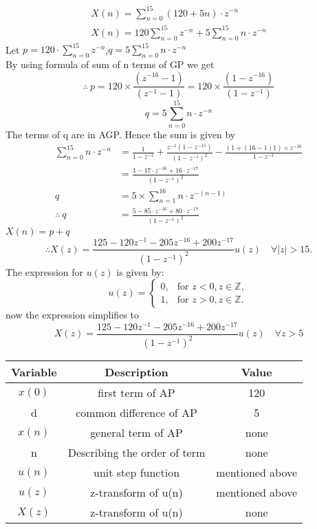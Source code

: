 \documentclass[journal,12pt,twocolumn]{IEEEtran}
\theoremstyle{remark}
\begin{document}
\begin{align}
   X(n) = \sum_{n=0}^{15} (120+5n) \cdot z^{-n}\\
   X(n) = 120\sum_{n=0}^{15}z^{-n}+5\sum_{n=0}^{15}n\cdot z^{-n}
\end{align}
Let $p = 120 \cdot \sum_{n=0}^{15} z^{-n}$,$q = 5\sum_{n=0}^{15}n\cdot z^{-n}$\\
By using formula of sum of n terms of GP we get
\begin{equation}
    \therefore\ p=120\times \frac{ ( z^{-16}-1)}{(z^{-1}-1)}=120\times \frac{ (1 - z^{-16})}{(1 - z^{-1})}
\end{equation}
\begin{equation}
   q= 5\sum_{n=0}^{15}n\cdot z^{-n}  
\end{equation}
The terms of q are in AGP. Hence the sum is given by
\begin{align}
  \sum_{n=0}^{15}n\cdot z^{-n}&= \frac{1}{1 - z^{-1} }+ \frac{z^{-1}(1 - z^{-15})}{(1 - z^{-1})^2}-\frac{(1+(16-1)1)\times z^{-16}}{1-z^{-1}} \\
  &=\frac{1-17\cdot z^{-16}+16\cdot z^{-17}}{(1-z^{-1})^{2}}\\
q&=5\times \sum_{n=1}^{16}n\cdot z^{-(n-1)}\\
\therefore \ q&=\frac{5-85\cdot z^{-16}+80\cdot z^{-17}}{(1-z^{-1})^{2}}
\end{align}
$X(n)=p+q$
\begin{equation}
\therefore X(z) = \frac{125 -120 z^{-1}-205 z^{-16}+200 z^{-17}}{(1-z^{-1})^2} u(z) \quad \forall \lvert z \rvert > 15.
\end{equation}
The expression for \( u(z) \) is given by:
\[
u(z) = 
\begin{cases}
    0, & \text{for } z < 0, z \in \mathbb{Z}, \\
    1, & \text{for } z > 0, z \in \mathbb{Z}.
\end{cases}
\]
now the expression simplifies to 
\begin {equation}
X(z) = \frac{125 -120 z^{-1}-205 z^{-16}+200 z^{-17}}{(1-z^{-1})^2} u(z) \quad \forall z>5
\end {equation}
\begin{table}[h]
  \centering
  \begin{tabular}{|c|c|c|}
    \hline
      \textbf{Variable}& \textbf{Description}& \textbf{Value}\\\hline
    $x(0)$& first term of AP& 120  \\\hline
    d& common difference of AP & 5\\\hline
    $x(n)$ & general  term of AP&none\\\hline
   n & Describing the order of term & none\\\hline
    $u(n)$& unit step function & mentioned above\\\hline
    $u(z) $& z-transform of u(n) & mentioned above\\\hline
    $X(z)$& z-transform of u(n) & none\\ 
    \hline
  \end{tabular}
  \end {table}
\end{document}
